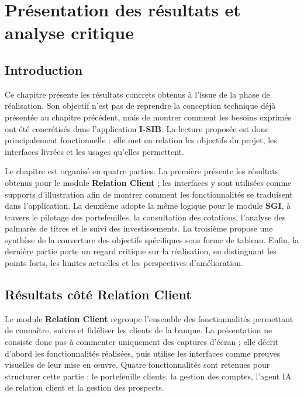 \documentclass[a4paper,12pt]{report}
\begin{document}
\chapter{Présentation des résultats et analyse critique}

\section*{Introduction}
{}

Ce chapitre présente les résultats concrets obtenus à l'issue de la phase de
réalisation. Son objectif n'est pas de reprendre la conception technique déjà
présentée au chapitre précédent, mais de montrer comment les besoins exprimés
ont été concrétisés dans l'application \textbf{I-SIB}. La lecture proposée est
donc principalement fonctionnelle : elle met en relation les objectifs du projet,
les interfaces livrées et les usages qu'elles permettent.

Le chapitre est organisé en quatre parties. La première présente les résultats
obtenus pour le module \textbf{Relation Client} ; les interfaces y sont utilisées
comme supports d'illustration afin de montrer comment les fonctionnalités se
traduisent dans l'application. La deuxième adopte la même logique pour le module
\textbf{SGI}, à travers le pilotage des portefeuilles, la consultation des
cotations, l'analyse des palmarès de titres et le suivi des investissements. La
troisième propose une synthèse de la couverture des objectifs spécifiques sous
forme de tableau. Enfin, la dernière partie porte un regard critique sur la
réalisation, en distinguant les points forts, les limites actuelles et les
perspectives d'amélioration.

\section{Résultats côté Relation Client}

Le module \textbf{Relation Client} regroupe l'ensemble des fonctionnalités
permettant de connaître, suivre et fidéliser les clients de la banque. La
présentation ne consiste donc pas à commenter uniquement des captures d'écran ;
elle décrit d'abord les fonctionnalités réalisées, puis utilise les interfaces
comme preuves visuelles de leur mise en œuvre. Quatre fonctionnalités sont
retenues pour structurer cette partie : le portefeuille clients, la gestion des
comptes, l'agent IA de relation client et la gestion des prospects.
\end{document}

